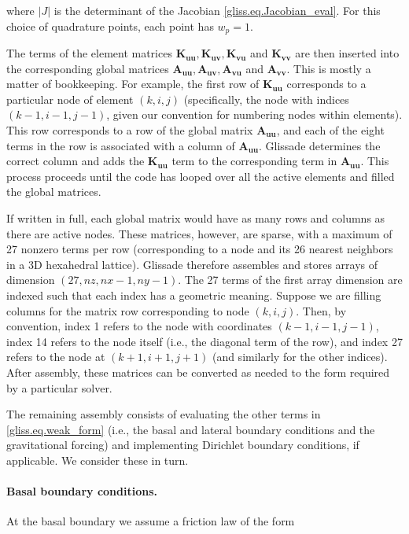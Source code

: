 \noindent
where $|J|$ is the determinant of the Jacobian \eqref{gliss.eq.Jacobian_eval}. For this choice of quadrature points,
each point has $w_p = 1$.

The terms of the element matrices $\mathbf{K_{uu}}, \mathbf{K_{uv}}, \mathbf{K_{vu}}$ and $\mathbf{K_{vv}}$
are then inserted into the corresponding global matrices $\mathbf{A_{uu}}, \mathbf{A_{uv}}, \mathbf{A_{vu}}$ and $\mathbf{A_{vv}}$.
This is mostly a matter of bookkeeping.
For example, the first row of $\mathbf{K_{uu}}$ corresponds to a particular node of element $(k,i,j)$
(specifically, the node with indices $(k-1,i-1,j-1)$, given our convention for numbering nodes within elements).  
This row corresponds to a row of the global matrix $\mathbf{A_{uu}}$, 
and each of the eight terms in the row is associated with a column of $\mathbf{A_{uu}}$.  
Glissade determines the correct column
and adds the $\mathbf{K_{uu}}$ term to the corresponding term in $\mathbf{A_{uu}}$.  This process proceeds
until the code has looped over all the active elements and filled the global matrices.

If written in full, each global matrix would have as many rows and columns as there are active nodes.
These matrices, however, are sparse, with a maximum of 27 nonzero terms per row (corresponding to
a node and its 26 nearest neighbors in a 3D hexahedral lattice).
Glissade therefore assembles and stores arrays of dimension $(27,nz,nx-1,ny-1)$.
The 27 terms of the first array dimension are indexed such that each index has a geometric meaning.
Suppose we are filling columns for the matrix row corresponding to node $(k,i,j)$. 
Then, by convention, index 1 refers to the node with coordinates $(k-1,i-1,j-1)$, index 14 refers to the
node itself (i.e., the diagonal term of the row), and index 27 refers to the node at $(k+1,i+1,j+1)$
(and similarly for the other indices).
After assembly, these matrices can be converted as needed to the form required by a particular solver.

The remaining assembly consists of evaluating the other terms in \eqref{gliss.eq.weak_form}
(i.e., the basal and lateral boundary conditions and the gravitational forcing) and implementing
Dirichlet boundary conditions, if applicable. We consider these in turn.

\paragraph{Basal boundary conditions.}

At the basal boundary we assume a friction law of the form 

